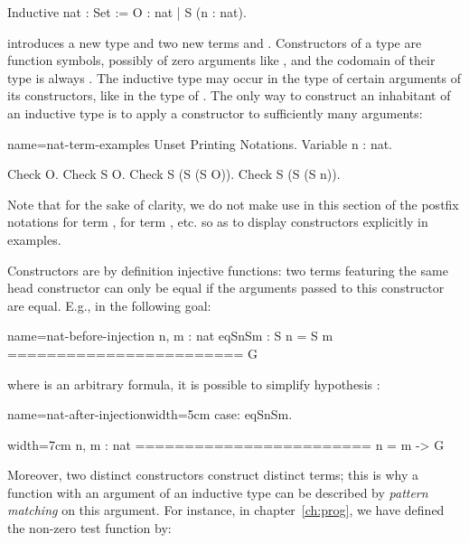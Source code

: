 \begin{coq}{}{}
Inductive nat : Set := O : nat | S (n : nat).
\end{coq}
introduces a new type  and two new terms  and
. Constructors of a type  are function symbols,
possibly of zero arguments like , and the codomain of their type is
always . The inductive type  may occur in
the type of certain arguments of its constructors, like 
in the type of
. The only way to construct an inhabitant of an
inductive type is to apply a constructor to sufficiently many
arguments:

\begin{coq}{name=nat-term-examples}{}
Unset Printing Notations.
Variable n : nat.

Check O.
Check S O.
Check S (S (S O)).
Check S (S (S n)).

\end{coq}

Note that for the sake of clarity, we do not make use in this section
of the postfix  notations  for term ,  for
term , etc. so as to display constructors 
explicitly in examples.

Constructors are by definition injective functions: two terms
featuring the same head constructor can only be equal if the arguments
passed to this constructor are equal. E.g., in the following goal:

\begin{coqout}{name=nat-before-injection}{}
n, m : nat
eqSnSm : S n = S m
========================
G
\end{coqout}

where  is an arbitrary formula, it is possible to simplify
hypothesis :

\begin{coq-left}{name=nat-after-injection}{width=5cm}
case: eqSnSm.
$~$
$~$
$~$
$~$
\end{coq-left}
\begin{coqout-right}{}{width=7cm}
n, m : nat
========================
n = m -> G
\end{coqout-right}

Moreover, two distinct constructors construct distinct
terms; this is why a function with an argument of an inductive type can be
described by \emph{pattern matching} on this argument. For instance, in
chapter~\ref{ch:prog}, we have defined the non-zero test
function by:


